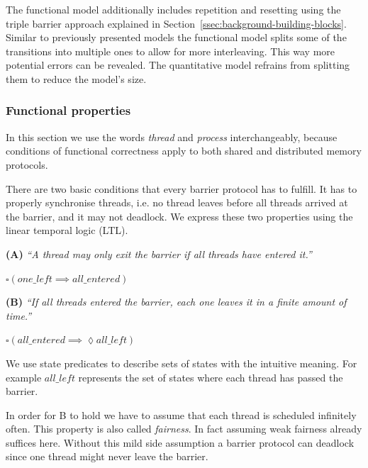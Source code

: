 \documentclass[a4paper, 10pt]{article}
\begin{document}
The functional model additionally includes repetition and resetting using the triple barrier approach explained in Section~\ref{ssec:background-building-blocks}.
Similar to previously presented models the functional model splits some of the transitions into multiple ones to allow for more interleaving. This way more potential errors can be revealed. The quantitative model refrains from splitting them to reduce the model's size.

\subsubsection{Functional properties}
\label{sssec:analysis-modelchecking-functional-properties}
In this section we use the words \emph{thread} and \emph{process} interchangeably, because conditions of functional correctness apply to both shared and distributed memory protocols.

There are two basic conditions that every barrier protocol has to fulfill.
It has to properly synchronise threads, i.e. no thread leaves before all threads arrived at the barrier, and it may not deadlock.
We express these two properties using the linear temporal logic (LTL).

\vspace{0.2cm}
\noindent \textbf{(A)} \emph{``A thread may only exit the barrier if all threads have entered it.''}
\begin{center}
	$\square ( \mathit{one\_left} \implies \mathit{all\_entered} )$
\end{center}

\vspace{0.2cm}
\noindent \textbf{(B)} \emph{``If all threads entered the barrier, each one leaves it in a finite amount of time.''}
\begin{center}
	$\square ( \mathit{all\_entered} \implies \lozenge \mathit{all\_left} )$
\end{center}

We use state predicates to describe sets of states with the intuitive meaning. For example $\mathit{all\_left}$ represents the set of states where each thread has passed the barrier.

In order for B to hold we have to assume that each thread is scheduled infinitely often. This property is also called \emph{fairness}. In fact assuming weak fairness already suffices here. Without this mild side assumption a barrier protocol can deadlock since one thread might never leave the barrier.
\end{document}
